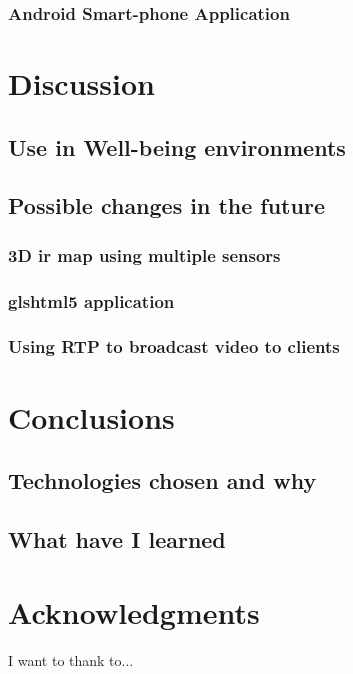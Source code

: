 \documentclass[hidelinks,11pt,a4paper,oneside,article]{memoir}
\begin{document}
\subsection{Android Smart-phone Application}



\chapter{Discussion}
\section{Use in Well-being environments}
\section{Possible changes in the future}
\subsection{3D \gls{ir} map using multiple sensors}
\subsection{gls{html}5 application}
\subsection{Using RTP to broadcast video to clients}


\chapter{Conclusions}
\section{Technologies chosen and why}
\section{What have I learned}

\chapter{Acknowledgments}
I want to thank to... 



\end{document}
